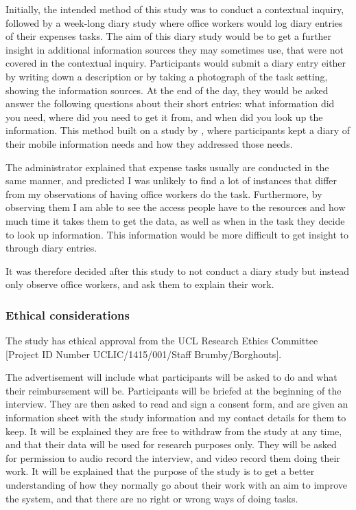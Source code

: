 \documentclass[11pt,oneside]{report}
\begin{document}
Initially, the intended method of this study was to conduct a contextual inquiry, followed by a week-long diary study where office workers would log diary entries of their expenses tasks. The aim of this diary study would be to get a further insight in additional information sources they may sometimes use, that were not covered in the contextual inquiry.  Participants would submit a diary entry either by writing down a description or by taking a photograph of the task setting, showing the information sources. At the end of the day, they would be asked answer the following questions about their short entries: what information did you need, where did you need to get it from, and when did you look up the information. This method built on a study by \citet{Sohn2008}, where participants kept a diary of their mobile information needs and how they addressed those needs. 

The administrator explained that expense tasks usually are conducted in the same manner, and predicted I was unlikely to find a lot of instances that differ from my observations of having office workers do the task.
Furthermore, by observing them I am able to see the access people have to the resources and how much time it takes them to get the data, as well as when in the task they decide to look up information. This information would be more difficult to get insight to through diary entries.

It was therefore decided after this study to not conduct a diary study but instead only observe office workers, and ask them to explain their work.

\subsubsection{Ethical considerations}
The study has ethical approval from the UCL Research Ethics Committee [Project ID Number UCLIC/1415/001/Staff Brumby/Borghouts]. 

The advertisement will include what participants will be asked to do and what their reimbursement will be. 
Participants will be briefed at the beginning of the interview. They are then asked to read and sign a consent form, and are given an information sheet with the study information and my contact details for them to keep. 
It will be explained they are free to withdraw from the study at any time, and that their data will be used for research purposes only. They will be asked for permission to audio record the interview, and video record them doing their work. It will be explained that the purpose of the study is to get a better understanding of how they normally go about their work with an aim to improve the system, and that there are no right or wrong ways of doing tasks. 
\end{document}
